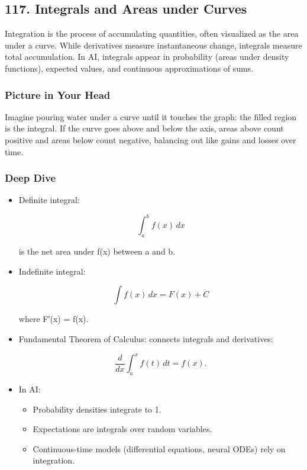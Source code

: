 \documentclass[
  letterpaper,
  DIV=11,
  numbers=noendperiod]{scrreprt}
\providecommand{\tightlist}{%
  \setlength{\itemsep}{0pt}\setlength{\parskip}{0pt}}
\begin{document}
\subsection{117. Integrals and Areas under
Curves}\label{integrals-and-areas-under-curves}

Integration is the process of accumulating quantities, often visualized
as the area under a curve. While derivatives measure instantaneous
change, integrals measure total accumulation. In AI, integrals appear in
probability (areas under density functions), expected values, and
continuous approximations of sums.

\subsubsection{Picture in Your Head}\label{picture-in-your-head-116}

Imagine pouring water under a curve until it touches the graph: the
filled region is the integral. If the curve goes above and below the
axis, areas above count positive and areas below count negative,
balancing out like gains and losses over time.

\subsubsection{Deep Dive}\label{deep-dive-116}

\begin{itemize}
\item
  Definite integral:

  \[
  \int_a^b f(x)\,dx
  \]

  is the net area under f(x) between a and b.
\item
  Indefinite integral:

  \[
  \int f(x)\,dx = F(x) + C
  \]

  where F′(x) = f(x).
\item
  Fundamental Theorem of Calculus: connects integrals and derivatives:

  \[
  \frac{d}{dx}\int_a^x f(t)\,dt = f(x).
  \]
\item
  In AI:

  \begin{itemize}
  \tightlist
  \item
    Probability densities integrate to 1.
  \item
    Expectations are integrals over random variables.
  \item
    Continuous-time models (differential equations, neural ODEs) rely on
    integration.
  \end{itemize}
\end{itemize}
\end{document}
